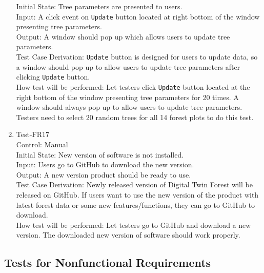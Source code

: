 \documentclass[12pt, titlepage]{article}
\begin{document}
\begin{enumerate}
Initial State: Tree parameters are presented to users.\\

Input: A click event on \verb|Update| button located at right bottom of the window
presenting tree parameters.\\

Output: A window should pop up which allows users to update tree parameters.\\

Test Case Derivation: \verb|Update| button is designed for users to update data,
so a window should pop up to allow users to update tree parameters
after clicking \verb|Update| button.\\
					
How test will be performed:  Let testers click \verb|Update| button located 
at the right bottom of the window
presenting tree parameters for 20 times. A window should always pop up to allow users
to update tree parameters. Testers need to select 20 random trees for all 14 forest
plots to do this test.

\item{Test-FR17\\}
Control: Manual\\ 

Initial State: New version of software is not installed.\\

Input: Users go to GitHub to download the new version.\\

Output: A new version product should be ready to use.\\

Test Case Derivation: Newly released version of Digital Twin Forest will be released
on GitHub. If users want to use the new version of the product with latest forest data
or some new features/functions, they can go to GitHub to download.\\
					
How test will be performed:  Let testers go to GitHub and download a new version. The 
downloaded new version of software should work properly.
\end{enumerate}


\subsection{Tests for Nonfunctional Requirements}
\end{document}

